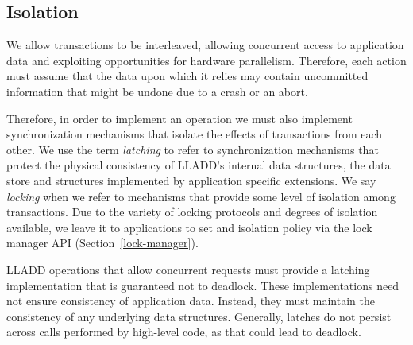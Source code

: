\documentclass[10pt,letterpaper,twocolumn,english]{article}
\newcommand{\yad}{LLADD\xspace}
\begin{document}
\subsection{Isolation}
\label{Isolation}

We allow transactions to be interleaved, allowing concurrent access to
application data and exploiting opportunities for hardware
parallelism.  Therefore, each action must assume that the
data upon which it relies may contain uncommitted
information that might be undone due to a crash or an abort.


Therefore, in order to implement an operation we must also implement
synchronization mechanisms that isolate the effects of transactions
from each other.  We use the term {\em latching} to refer to
synchronization mechanisms that protect the physical consistency of
\yad's internal data structures, the data store and structures implemented by application specific extensions.  We say {\em
locking} when we refer to mechanisms that provide some level of
isolation among transactions.  
Due to the variety of locking protocols and degrees of isolation available, we leave it to applications to set and isolation policy via the lock manager API (Section~\ref{lock-manager}).


\yad operations that allow concurrent requests must provide a latching
implementation that is guaranteed not to deadlock.
These implementations need not ensure consistency of application data.
Instead, they must maintain the consistency of any underlying data
structures.  Generally, latches do not persist across calls performed
by high-level code, as that could lead to deadlock.
\end{document}
